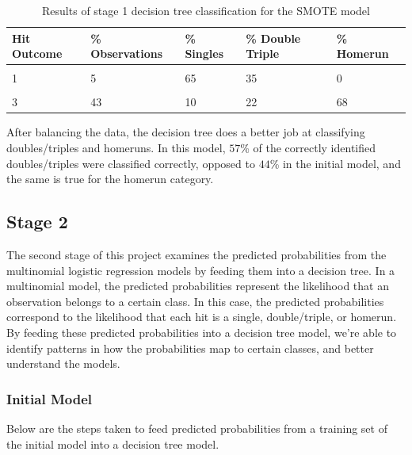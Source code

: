 \documentclass[
  letterpaper,
  DIV=11,
  numbers=noendperiod]{scrartcl}
\begin{document}
\begin{table}[!h]
\centering
\caption{\label{tab:unnamed-chunk-48}Results of stage 1 decision tree classification for the SMOTE model}
\centering
\begin{tabular}[t]{lllll}
\toprule
Hit Outcome & \% Observations & \% Singles & \% Double Triple & \% Homerun\\
\midrule
\cellcolor{gray!10}{1} & \cellcolor{gray!10}{32} & \cellcolor{gray!10}{74} & \cellcolor{gray!10}{26} & \cellcolor{gray!10}{0}\\
1 & 5 & 65 & 35 & 0\\
\cellcolor{gray!10}{2} & \cellcolor{gray!10}{20} & \cellcolor{gray!10}{34} & \cellcolor{gray!10}{57} & \cellcolor{gray!10}{9}\\
3 & 43 & 10 & 22 & 68\\
\bottomrule
\end{tabular}
\end{table}

After balancing the data, the decision tree does a better job at
classifying doubles/triples and homeruns. In this model, \(57\)\% of the
correctly identified doubles/triples were classified correctly, opposed
to \(44\)\% in the initial model, and the same is true for the homerun
category.

\subsection{Stage 2}\label{stage-2}

The second stage of this project examines the predicted probabilities
from the multinomial logistic regression models by feeding them into a
decision tree. In a multinomial model, the predicted probabilities
represent the likelihood that an observation belongs to a certain class.
In this case, the predicted probabilities correspond to the likelihood
that each hit is a single, double/triple, or homerun. By feeding these
predicted probabilities into a decision tree model, we're able to
identify patterns in how the probabilities map to certain classes, and
better understand the models.

\subsubsection{Initial Model}\label{initial-model-1}

Below are the steps taken to feed predicted probabilities from a
training set of the initial model into a decision tree model.
\end{document}

